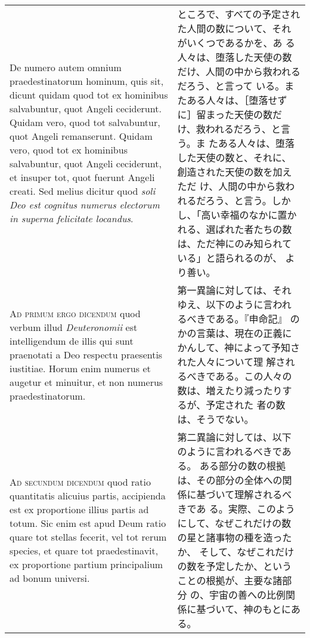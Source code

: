 \documentclass[10pt]{jsarticle} %
\begin{document}
\begin{longtable}{p{21em}p{21em}}
\\

De numero autem omnium
praedestinatorum hominum, quis sit, dicunt quidam quod tot ex hominibus
salvabuntur, quot Angeli ceciderunt. Quidam vero, quod tot salvabuntur,
quot Angeli remanserunt. Quidam vero, quod tot ex hominibus salvabuntur,
quot Angeli ceciderunt, et insuper tot, quot fuerunt Angeli creati. Sed
melius dicitur quod {\itshape soli Deo est cognitus numerus electorum in superna
felicitate locandus}.


&


ところで、すべての予定された人間の数について、それがいくつであるかを、あ
 る人々は、堕落した天使の数だけ、人間の中から救われるだろう、と言って
 いる。またある人々は、［堕落せずに］留まった天使の数だけ、救われるだろう、と言う。ま
 たある人々は、堕落した天使の数と、それに、創造された天使の数を加えただ
 け、人間の中から救われるだろう、と言う。しかし、「高い幸福のなかに置か
 れる、選ばれた者たちの数は、ただ神にのみ知られている」と語られるのが、
 より善い。


\\


{\scshape Ad primum ergo dicendum} quod verbum illud
{\itshape Deuteronomii} est intelligendum de illis qui sunt praenotati a Deo
respectu praesentis iustitiae. Horum enim numerus et augetur et
minuitur, et non numerus praedestinatorum.


&

第一異論に対しては、それゆえ、以下のように言われるべきである。『申命記』
 のかの言葉は、現在の正義にかんして、神によって予知された人々について理
 解されるべきである。この人々の数は、増えたり減ったりするが、予定された
 者の数は、そうでない。



\\


{\scshape Ad secundum dicendum} quod ratio quantitatis
alicuius partis, accipienda est ex proportione illius partis ad
totum. Sic enim est apud Deum ratio quare tot stellas fecerit, vel tot
rerum species, et quare tot praedestinavit, ex proportione partium
principalium ad bonum universi.


&


第二異論に対しては、以下のように言われるべきである。
ある部分の数の根拠は、その部分の全体への関係に基づいて理解されるべきであ
 る。実際、このようにして、なぜこれだけの数の星と諸事物の種を造ったか、
 そして、なぜこれだけの数を予定したか、ということの根拠が、主要な諸部分
 の、宇宙の善への比例関係に基づいて、神のもとにある。


\end{longtable}
\end{document}
